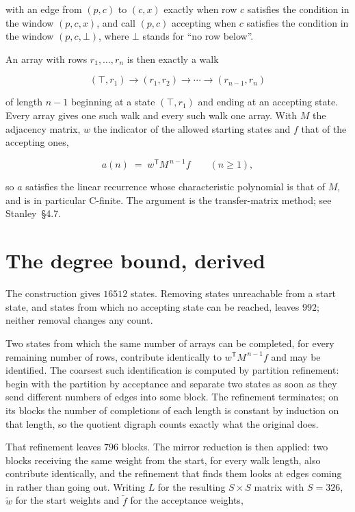 \documentclass[11pt]{article}
\theoremstyle{definition}
\begin{document}
with an edge from $(p,c)$ to $(c,x)$ exactly when row $c$ satisfies the condition in the window $(p,c,x)$, and call $(p,c)$ accepting when $c$ satisfies the condition in the window $(p,c,\bot)$, where $\bot$ stands for ``no row below''.

An array with rows $r_1,\dots,r_n$ is then exactly a walk

\[(\top,r_1) \to (r_1,r_2) \to \cdots \to (r_{n-1},r_n)\]

of length $n-1$ beginning at a state $(\top,r_1)$ and ending at an accepting state. Every array gives one such walk and every such walk one array. With $M$ the adjacency matrix, $w$ the indicator of the allowed starting states and $f$ that of the accepting ones,

\[a(n) \;=\; w^{\mathsf T} M^{\,n-1} f \qquad (n \ge 1),\]

so $a$ satisfies the linear recurrence whose characteristic polynomial is that of $M$, and is in particular C-finite. The argument is the transfer-matrix method; see Stanley~\S4.7.

\section{The degree bound, derived}

The construction gives $16512$ states. Removing states unreachable from a start state, and states from which no accepting state can be reached, leaves $992$; neither removal changes any count.

Two states from which the same number of arrays can be completed, for every remaining number of rows, contribute identically to $w^{\mathsf T}M^{\,n-1}f$ and may be identified. The coarsest such identification is computed by partition refinement: begin with the partition by acceptance and separate two states as soon as they send different numbers of edges into some block. The refinement terminates; on its blocks the number of completions of each length is constant by induction on that length, so the quotient digraph counts exactly what the original does.

That refinement leaves $796$ blocks. The mirror reduction is then applied: two blocks receiving the same weight from the start, for every walk length, also contribute identically, and the refinement that finds them looks at edges coming in rather than going out. Writing $L$ for the resulting $S \times S$ matrix with $S = 326$, $\tilde w$ for the start weights and $\tilde f$ for the acceptance weights,
\end{document}
